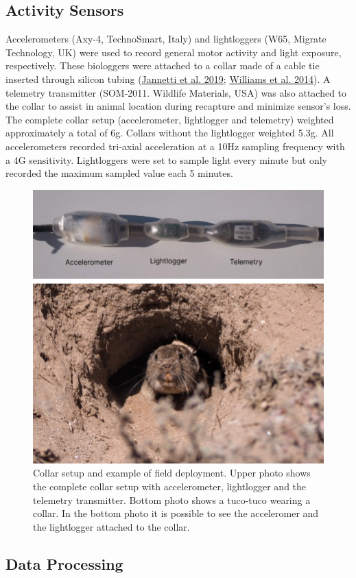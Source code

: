 \documentclass[english,msc,numbers,hidelinks]{coppe}
\begin{document}
  \hypertarget{activity-sensors}{%
  \subsection{Activity Sensors}\label{activity-sensors}}

  Accelerometers (Axy-4, TechnoSmart, Italy) and lightloggers (W65, Migrate Technology, UK) were used to record general motor activity and light exposure, respectively. These biologgers were attached to a collar made of a cable tie inserted through silicon tubing (\protect\hyperlink{ref-jannetti2019}{Jannetti et al. 2019}; \protect\hyperlink{ref-williams2014}{Williams et al. 2014}). A telemetry transmitter (SOM-2011. Wildlife Materials, USA) was also attached to the collar to assist in animal location during recapture and minimize sensor's loss. The complete collar setup (accelerometer, lightlogger and telemetry) weighted approximately a total of 6g. Collars without the lightlogger weighted 5.3g. All accelerometers recorded tri-axial acceleration at a 10Hz sampling frequency with a 4G sensitivity. Lightloggers were set to sample light every minute but only recorded the maximum sampled value each 5 minutes.
  \begin{figure}

  {\centering \includegraphics[width=1\linewidth]{../04_figures/collar/collar_tuco} 

  }

  \caption{Collar setup and example of field deployment. Upper photo shows the complete collar setup with accelerometer, lightlogger and the telemetry transmitter. Bottom photo shows a tuco-tuco wearing a collar. In the bottom photo it is possible to see the acceleromer and the lightlogger attached to the collar.}\label{fig:methods-collar}
  \end{figure}
  \hypertarget{data-processing}{%
  \subsection{Data Processing}\label{data-processing}}
\end{document}

